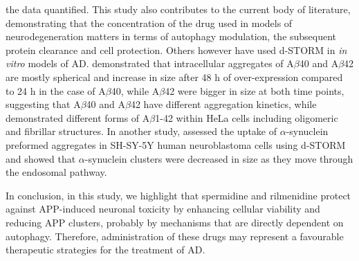 the data quantified. This study also contributes to the current body of literature, demonstrating that the concentration of the drug used in models of neurodegeneration matters in terms of autophagy modulation, the subsequent protein clearance and cell protection. Others however have used d-STORM in \textit{in vitro} models of AD. \citet{Esbjorner2014} demonstrated that intracellular aggregates of A$\beta$40 and A$\beta$42 are mostly spherical and increase in size after 48 h of over-expression compared to 24 h in the case of A$\beta$40, while A$\beta$42 were bigger in size at both time points, suggesting that A$\beta$40 and A$\beta$42 have different aggregation kinetics, while \citet{KaminskiSchierle2011} demonstrated different forms of A$\beta$1-42 within HeLa cells including oligomeric and fibrillar structures. In another study, \citet{Apetri2016} assessed the uptake of $\alpha$-synuclein preformed aggregates in SH-SY-5Y human neuroblastoma cells using d-STORM and showed that $\alpha$-synuclein clusters were decreased in size as they move through the endosomal pathway. 

In conclusion, in this study, we highlight that spermidine and rilmenidine protect against APP-induced neuronal toxicity by enhancing cellular viability and reducing APP clusters, probably by mechanisms that are directly dependent on autophagy. Therefore, administration of these drugs may represent a favourable therapeutic strategies for the treatment of AD. 




























